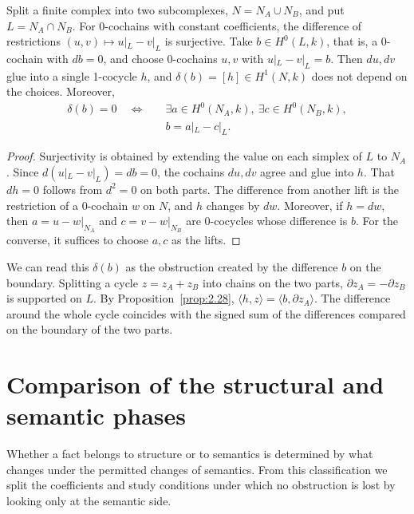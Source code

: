 \begin{proposition}\label{prop:2.29}

Split a finite complex into two subcomplexes, $N=N_A\cup N_B$, and put $L=N_A\cap N_B$.
For 0-cochains with constant coefficients, the difference of restrictions
$(u,v)\mapsto u|_L-v|_L$ is surjective. Take $b\in H^0(L,k)$, that is, a 0-cochain with
$db=0$, and choose 0-cochains $u,v$ with $u|_L-v|_L=b$. Then $du,dv$ glue into a
single 1-cocycle $h$, and $\delta(b)=[h]\in H^1(N,k)$ does not depend on the choices.
Moreover,
\begin{equation*}
\begin{aligned}
\delta(b)=0\quad\Longleftrightarrow\quad
&\exists a\in H^0(N_A,k),\ \exists c\in H^0(N_B,k),\\
&b=a|_L-c|_L.
\end{aligned}
\tag{2.19}\label{eq:2.19}
\end{equation*}

\end{proposition}

\begin{proof}

Surjectivity is obtained by extending the value on each simplex of $L$ to $N_A$. Since
$d(u|_L-v|_L)=db=0$, the cochains $du,dv$ agree and glue into $h$. That $dh=0$
follows from $d^2=0$ on both parts. The difference from another lift is the restriction of
a 0-cochain $w$ on $N$, and $h$ changes by $dw$. Moreover, if $h=dw$, then
$a=u-w|_{N_A}$ and $c=v-w|_{N_B}$ are 0-cocycles whose difference is $b$. For the
converse, it suffices to choose $a,c$ as the lifts.

\end{proof}

We can read this $\delta(b)$ as the obstruction created by the difference $b$ on the
boundary. Splitting a cycle $z=z_A+z_B$ into chains on the two parts,
$\partial z_A=-\partial z_B$ is supported on $L$. By Proposition~\ref{prop:2.28},
$\langle h,z\rangle=\langle b,\partial z_A\rangle$. The difference around the whole cycle
coincides with the signed sum of the differences compared on the boundary of the two
parts.

\section{Comparison of the structural and semantic phases}\label{sec:2.7}

Whether a fact belongs to structure or to semantics is determined by what changes under
the permitted changes of semantics. From this classification we split the coefficients and
study conditions under which no obstruction is lost by looking only at the semantic side.

